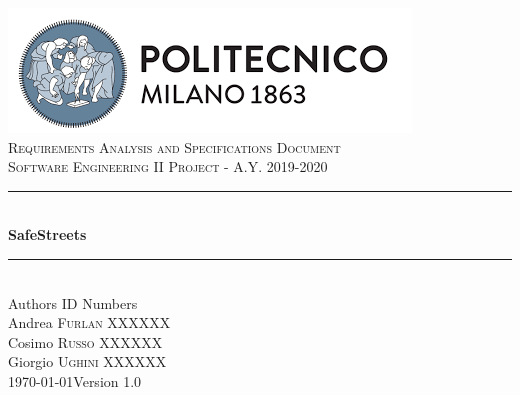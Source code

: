 \documentclass[12pt]{article}
\begin{document}
\begin{titlepage}
\newcommand{\HRule}{\rule{\linewidth}{0.7mm}}
\center
\includegraphics{PolimiLogo.png}\\[1cm]

\textsc{\LARGE Requirements Analysis and Specifications Document}\\[1cm]
\textsc{\large Software Engineering II Project - A.Y. 2019-2020}\\[1cm]
\HRule \\[0.4cm]
{ \huge \bfseries SafeStreets}\\[0.15cm]
\HRule \\[1.5cm]
{\large Authors  \hfill ID Numbers}\\[0.4cm]
{\large Andrea \textsc{Furlan}  \hfill XXXXXX}\\[0.2cm]
{\large Cosimo \textsc{Russo}  \hfill XXXXXX}\\[0.2cm]
{\large Giorgio \textsc{Ughini} \hfill XXXXXX}\\[2cm]
{\large \today  \hfill Version 1.0}
\vfill
\end{titlepage}
\end{document}
